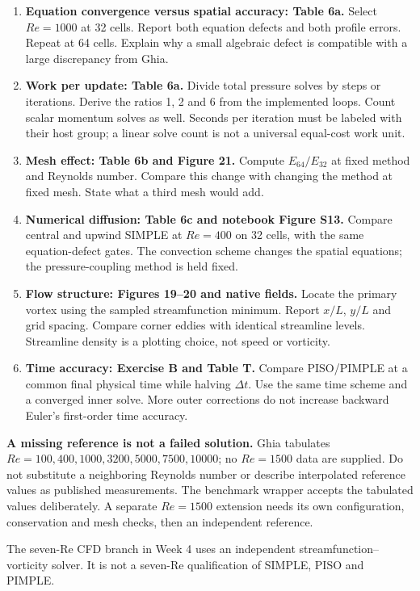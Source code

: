 \begin{enumerate}
\item \textbf{Equation convergence versus spatial accuracy: Table 6a.}
Select $Re=1000$ at 32 cells. Report both equation defects and both profile
errors. Repeat at 64 cells. Explain why a small algebraic defect is compatible
with a large discrepancy from Ghia.
\item \textbf{Work per update: Table 6a.}
Divide total pressure solves by steps or iterations. Derive the ratios 1, 2
and 6 from the implemented loops. Count scalar momentum solves as well.
Seconds per iteration must be labeled with their host group; a linear solve
count is not a universal equal-cost work unit.
\item \textbf{Mesh effect: Table 6b and Figure 21.}
Compute $E_{64}/E_{32}$ at fixed method and Reynolds number. Compare this change
with changing the method at fixed mesh. State what a third mesh would add.
\item \textbf{Numerical diffusion: Table 6c and notebook Figure S13.}
Compare central and upwind SIMPLE at $Re=400$ on 32 cells, with the same
equation-defect gates. The convection scheme changes the spatial equations;
the pressure-coupling method is held fixed.
\item \textbf{Flow structure: Figures 19--20 and native fields.}
Locate the primary vortex using the sampled streamfunction minimum. Report
$x/L$, $y/L$ and grid spacing. Compare corner eddies with identical streamline
levels. Streamline density is a plotting choice, not speed or vorticity.
\item \textbf{Time accuracy: Exercise B and Table T.}
Compare PISO/PIMPLE at a common final physical time while halving $\Delta t$.
Use the same time scheme and a converged inner solve. More outer corrections
do not increase backward Euler's first-order time accuracy.
\end{enumerate}
\textbf{A missing reference is not a failed solution.} Ghia tabulates
$Re=100,400,1000,3200,5000,7500,10000$; no $Re=1500$ data are supplied.
Do not substitute a neighboring Reynolds number or describe interpolated
reference values as published measurements. The benchmark wrapper accepts
the tabulated values deliberately. A separate $Re=1500$ extension needs its
own configuration, conservation and mesh checks, then an independent reference.

The seven-Re CFD branch in Week 4 uses an independent streamfunction--vorticity
solver. It is not a seven-Re qualification of SIMPLE, PISO and PIMPLE.
